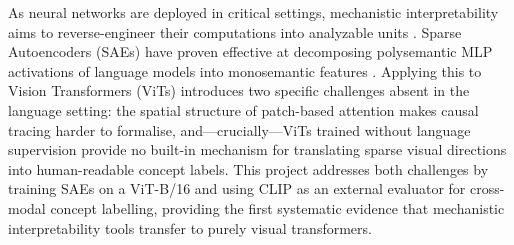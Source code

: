 As neural networks are deployed in critical settings, mechanistic interpretability aims to reverse-engineer their computations into analyzable units \cite{Elhage2021}. Sparse Autoencoders (SAEs) have proven effective at decomposing polysemantic MLP activations of language models into monosemantic features \cite{Cunningham2024, Bricken2023}. Applying this to Vision Transformers (ViTs) \cite{Dosovitskiy2021} introduces two specific challenges absent in the language setting: the spatial structure of patch-based attention makes causal tracing harder to formalise, and---crucially---ViTs trained without language supervision provide no built-in mechanism for translating sparse visual directions into human-readable concept labels. This project addresses both challenges by training SAEs on a ViT-B/16 and using CLIP \cite{Radford2021} as an external evaluator for cross-modal concept labelling, providing the first systematic evidence that mechanistic interpretability tools transfer to purely visual transformers.
